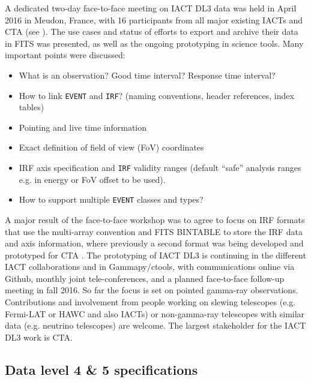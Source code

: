 A dedicated two-day face-to-face meeting on IACT DL3 data was held in April 2016 in Meudon, France, with 16 participants from all major existing IACTs and CTA (see \ogrameudon). The use cases and status of efforts to export and archive their data in FITS was presented, as well as the ongoing prototyping in science tools. Many important points were discussed:

\begin{itemize}
\item{}What is an observation? Good time interval? Response time interval?
\item{}How to link \texttt{EVENT} and \texttt{IRF}? (naming conventions, header references, index tables)
\item{}Pointing and live time information
\item{}Exact definition of field of view (FoV) coordinates
\item{}IRF axis specification and \texttt{IRF} validity ranges (default ``safe'' analysis ranges e.g. in energy or FoV offset to be used).
\item{}How to support multiple \texttt{EVENT} classes and types?
\end{itemize}



A major result of the face-to-face workshop was to agree to focus on IRF formats that use the multi-array convention and FITS BINTABLE to store the IRF data and axis information, where previously a second format was being developed and prototyped for CTA \citep{2015arXiv150807437W}. The prototyping of IACT DL3 is continuing in the different IACT collaborations and in Gammapy/ctools, with communications online via Github, monthly joint tele-conferences, and a planned face-to-face follow-up meeting in fall 2016. So far the focus is set on pointed gamma-ray observations. Contributions and involvement from people working on slewing telescopes (e.g. Fermi-LAT or HAWC and also IACTs) or non-gamma-ray telescopes with similar data (e.g. neutrino telescopes) are welcome. The largest stakeholder for the IACT DL3 work is CTA.


\subsection{Data level 4 \& 5 specifications}

